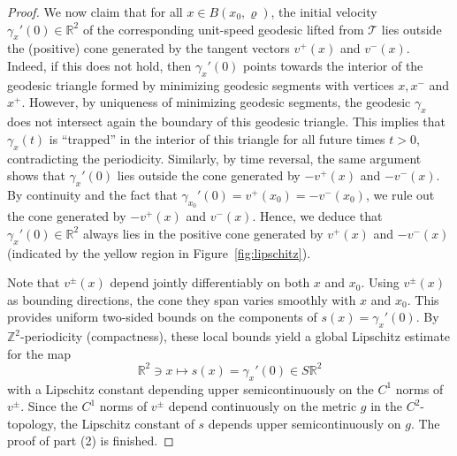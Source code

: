 \documentclass[11pt,letterpaper,oneside]{amsart}
\newcommand{\Z}{\mathbb{Z}}
\newcommand{\R}{\mathbb{R}}
\theoremstyle{definition}
\theoremstyle{remark}
\theoremstyle{definition}
\theoremstyle{remark}
\newcommand{\CT}{\mathcal{T}}
\begin{document}
\begin{proof}
\medskip

    We now claim that for all $x \in B(x_0, \varrho)$, the initial velocity $\gamma_x'(0) \in \R^2$ of the corresponding unit-speed geodesic lifted from $\CT$ lies outside the (positive) cone generated by the tangent vectors $v^+(x)$ and $v^-(x)$.
    Indeed, if this does not hold, then $\gamma_x'(0)$ points towards the interior of the geodesic triangle formed by minimizing geodesic segments with vertices $x, x^-$ and $x^+$.
    However, by uniqueness of minimizing geodesic segments, the geodesic $\gamma_x$ does not intersect again the boundary of this geodesic triangle.
    This implies that $\gamma_x(t)$ is ``trapped'' in the interior of this triangle for all future times $t > 0$, contradicting the periodicity.
    Similarly, by time reversal, the same argument shows that $\gamma_x'(0)$ lies outside the cone generated by $-v^+(x)$ and $-v^-(x)$.
    By continuity and the fact that $\gamma_{x_0}'(0) = v^+(x_0) = -v^-(x_0)$, we rule out the cone generated by $-v^+(x)$ and $v^-(x)$.
    Hence, we deduce that $\gamma_x'(0) \in \R^2$ always lies in the positive cone generated by $v^+(x)$ and $-v^-(x)$ (indicated by the yellow region in Figure~\ref{fig:lipschitz}).

    
    
\medskip

    Note that $v^\pm(x)$ depend jointly differentiably on both $x$ and $x_0$. 
    Using $v^\pm(x)$ as bounding directions, the cone they span varies smoothly with $x$ and $x_0$. 
    This provides uniform two-sided bounds on the components of $s(x)=\gamma_x'(0)$. 
    By $\Z^2$-periodicity (compactness), these local bounds yield a global Lipschitz estimate for the map 
    \[
    \R^2 \ni x \longmapsto s(x)=\gamma_x'(0) \in S\R^2
    \]
    with a Lipschitz constant depending upper semicontinuously on the $C^1$ norms of $v^\pm$.
    Since the $C^1$ norms of $v^\pm$ depend continuously on the metric $g$ in the $C^2$-topology, the Lipschitz constant of $s$ depends upper semicontinuously on $g$.
    The proof of part (2) is finished.

     
    
\medskip


\end{proof}
\end{document}
